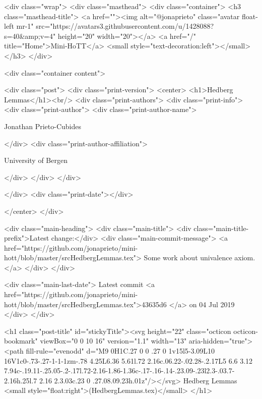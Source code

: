     <div class="wrap">
      <div class="masthead">
        <div class="container">
          <h3 class="masthead-title">
            <a href=""><img alt="@jonaprieto" class="avatar float-left mr-1" src="https://avatars3.githubusercontent.com/u/1428088?s=40&amp;v=4" height="20" width="20"></a>
            <a href="/" title="Home">Mini-HoTT</a>
            <small style="text-decoration:left"></small>
          </h3>
        </div>
      
      <div class="container content">
        







<div class="post">
  <div class="print-version">
    <center>
      <h1>Hedberg Lemmas</h1><br/>
        <div class="print-authors">
          <div class="print-info">
            <div class="print-author">
              <div class="print-author-name">
                
                  Jonathan Prieto-Cubides
                
              </div>
              <div class="print-author-affiliation">
                
                  University of Bergen
                
                </div>
            </div>
          </div>
          
          
        </div>
        <div class="print-date"></div>
        
        
    </center>
  </div>

  
  <div class="main-heading">
    <div class="main-title">
      <div class="main-title-prefix">Latest change:</div>
      <div class="main-commit-message">
            <a href="https://github.com/jonaprieto/mini-hott/blob/master/srcHedbergLemmas.tex">
              Some work about univalence axiom.</a>
      </div>
    </div>

    <div class="main-last-date">
      Latest commit <a href="https://github.com/jonaprieto/mini-hott/blob/master/srcHedbergLemmas.tex">43635d6 </a> on  04 Jul 2019
    </div>
  </div>
  

  <h1 class="post-title" id="stickyTitle"><svg height="22" class="octicon octicon-bookmark" viewBox="0 0 10 16" version="1.1" width="13" aria-hidden="true"><path fill-rule="evenodd" d="M9 0H1C.27 0 0 .27 0 1v15l5-3.09L10 16V1c0-.73-.27-1-1-1zm-.78 4.25L6.36 5.61l.72 2.16c.06.22-.02.28-.2.17L5 6.6 3.12 7.94c-.19.11-.25.05-.2-.17l.72-2.16-1.86-1.36c-.17-.16-.14-.23.09-.23l2.3-.03.7-2.16h.25l.7 2.16 2.3.03c.23 0 .27.08.09.23h.01z"/></svg> Hedberg Lemmas <small style="float:right">(HedbergLemmas.tex)</small>
  </h1>

